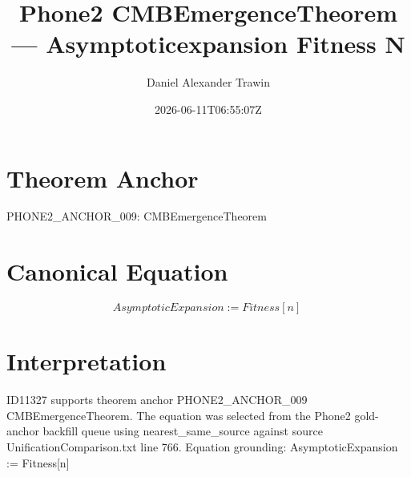 \documentclass[11pt]{article}
\title{Phone2 CMBEmergenceTheorem — Asymptoticexpansion Fitness N}
\author{Daniel Alexander Trawin}
\date{2026-06-11T06:55:07Z}
\begin{document}
\maketitle
\section*{Theorem Anchor}
PHONE2_ANCHOR_009: CMBEmergenceTheorem
\section*{Canonical Equation}
\[
AsymptoticExpansion := Fitness[n] ~
\]
\section*{Interpretation}
ID11327 supports theorem anchor PHONE2_ANCHOR_009 CMBEmergenceTheorem. The equation was selected from the Phone2 gold-anchor backfill queue using nearest_same_source against source UnificationComparison.txt line 766. Equation grounding: AsymptoticExpansion := Fitness[n] ~
\end{document}
